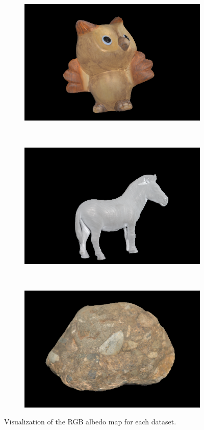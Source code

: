 \documentclass{paper}
\begin{document}
\begin{figure}[h!]
     \begin{subfigure}{0.3\textwidth}
        \includegraphics[width=\textwidth]{results/owl/owl_a_rgb}
    \end{subfigure}
    ~
    \begin{subfigure}{0.3\textwidth}
        \includegraphics[width=\textwidth]{results/horse/horse_a_rgb}
    \end{subfigure}
    ~
    \begin{subfigure}{0.3\textwidth}
        \includegraphics[width=\textwidth]{results/rock/rock_a_rgb}
    \end{subfigure}
    \caption{Visualization of the RGB albedo map for each dataset.}
    \label{fig:albedo_rgb}       
\end{figure}
\end{document}
